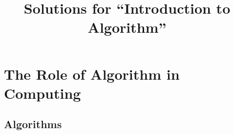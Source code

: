 \documentclass[10pt, a4paper]{article}
\begin{document}
\title{
Solutions for ``Introduction to Algorithm''
}
\newpage
\section{The Role of Algorithm in Computing}
\subsection{Algorithms}

\end{document}
